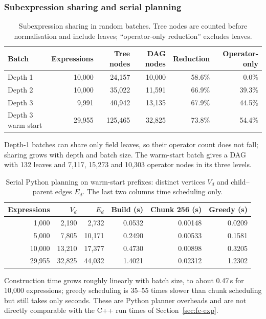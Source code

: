 \documentclass[11pt,a4paper]{article}
\begin{document}
\subsubsection{Subexpression sharing and serial planning}
\begin{table}[htbp]
\centering\small
\begin{tabular}{lrrrrr}
\toprule
Batch & Expressions & Tree nodes & DAG nodes & Reduction & Operator-only \\
\midrule
Depth 1 & 10,000 & 24,157 & 10,000 & 58.6\% & 0.0\% \\
Depth 2 & 10,000 & 35,022 & 11,591 & 66.9\% & 39.3\% \\
Depth 3 & 9,991 & 40,942 & 13,135 & 67.9\% & 44.5\% \\
Depth 3 warm start & 29,955 & 125,465 & 32,825 & 73.8\% & 54.4\% \\
\bottomrule
\end{tabular}
\caption{Subexpression sharing in random batches. Tree nodes are counted before normalisation and include leaves; ``operator-only reduction'' excludes leaves.}
\label{tab:dag-sharing}
\end{table}
Depth-1 batches can share only field leaves, so their operator count does not fall; sharing grows with depth and batch size. The warm-start batch gives a DAG with 132 leaves and 7,117, 15,273 and 10,303 operator nodes in its three levels.

\begin{table}[htbp]
\centering\small
\begin{tabular}{rrrrrr}
\toprule
Expressions & $V_d$ & $E_d$ & Build (s) & Chunk 256 (s) & Greedy (s) \\
\midrule
1,000 & 2,190 & 2,732 & 0.0532 & 0.00148 & 0.0209 \\
5,000 & 7,805 & 10,171 & 0.2490 & 0.00533 & 0.1581 \\
10,000 & 13,210 & 17,377 & 0.4730 & 0.00898 & 0.3205 \\
29,955 & 32,825 & 44,032 & 1.4021 & 0.02312 & 1.2302 \\
\bottomrule
\end{tabular}
\caption{Serial Python planning on warm-start prefixes: distinct vertices $V_d$ and child--parent edges $E_d$. The last two columns time scheduling only.}
\label{tab:dag-runtime}
\end{table}
Construction time grows roughly linearly with batch size, to about 0.47\,s for 10{,}000 expressions; greedy scheduling is 35--55 times slower than chunk scheduling but still takes only seconds. These are Python planner overheads and are not directly comparable with the C++ run times of Section~\ref{sec:fc-exp}.
\end{document}
